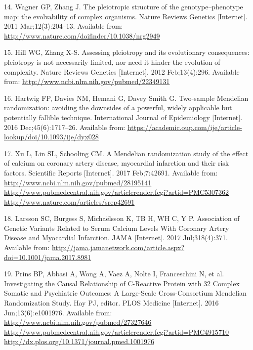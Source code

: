 \documentclass[]{article}
\begin{document}
\hypertarget{ref-Wagner2011}{}
14. Wagner GP, Zhang J. The pleiotropic structure of the
genotype--phenotype map: the evolvability of complex organisms. Nature
Reviews Genetics {[}Internet{]}. 2011 Mar;12(3):204--13. Available from:
\url{http://www.nature.com/doifinder/10.1038/nrg2949}

\hypertarget{ref-Hill2012a}{}
15. Hill WG, Zhang X-S. Assessing pleiotropy and its evolutionary
consequences: pleiotropy is not necessarily limited, nor need it hinder
the evolution of complexity. Nature Reviews Genetics {[}Internet{]}.
2012 Feb;13(4):296. Available from:
\url{http://www.ncbi.nlm.nih.gov/pubmed/22349131}

\hypertarget{ref-Hartwig2016}{}
16. Hartwig FP, Davies NM, Hemani G, Davey Smith G. Two-sample Mendelian
randomization: avoiding the downsides of a powerful, widely applicable
but potentially fallible technique. International Journal of
Epidemiology {[}Internet{]}. 2016 Dec;45(6):1717--26. Available from:
\url{https://academic.oup.com/ije/article-lookup/doi/10.1093/ije/dyx028}

\hypertarget{ref-Xu2017}{}
17. Xu L, Lin SL, Schooling CM. A Mendelian randomization study of the
effect of calcium on coronary artery disease, myocardial infarction and
their risk factors. Scientific Reports {[}Internet{]}. 2017 Feb;7:42691.
Available from:
\href{http://www.ncbi.nlm.nih.gov/pubmed/28195141\%20http://www.pubmedcentral.nih.gov/articlerender.fcgi?artid=PMC5307362\%20http://www.nature.com/articles/srep42691}{http://www.ncbi.nlm.nih.gov/pubmed/28195141 http://www.pubmedcentral.nih.gov/articlerender.fcgi?artid=PMC5307362 http://www.nature.com/articles/srep42691}

\hypertarget{ref-Larsson2017}{}
18. Larsson SC, Burgess S, Michaëlsson K, TB H, WH C, Y P. Association
of Genetic Variants Related to Serum Calcium Levels With Coronary Artery
Disease and Myocardial Infarction. JAMA {[}Internet{]}. 2017
Jul;318(4):371. Available from:
\url{http://jama.jamanetwork.com/article.aspx?doi=10.1001/jama.2017.8981}

\hypertarget{ref-Prins2016}{}
19. Prins BP, Abbasi A, Wong A, Vaez A, Nolte I, Franceschini N, et al.
Investigating the Causal Relationship of C-Reactive Protein with 32
Complex Somatic and Psychiatric Outcomes: A Large-Scale Cross-Consortium
Mendelian Randomization Study. Hay PJ, editor. PLOS Medicine
{[}Internet{]}. 2016 Jun;13(6):e1001976. Available from:
\href{http://www.ncbi.nlm.nih.gov/pubmed/27327646\%20http://www.pubmedcentral.nih.gov/articlerender.fcgi?artid=PMC4915710\%20http://dx.plos.org/10.1371/journal.pmed.1001976}{http://www.ncbi.nlm.nih.gov/pubmed/27327646 http://www.pubmedcentral.nih.gov/articlerender.fcgi?artid=PMC4915710 http://dx.plos.org/10.1371/journal.pmed.1001976}
\end{document}
